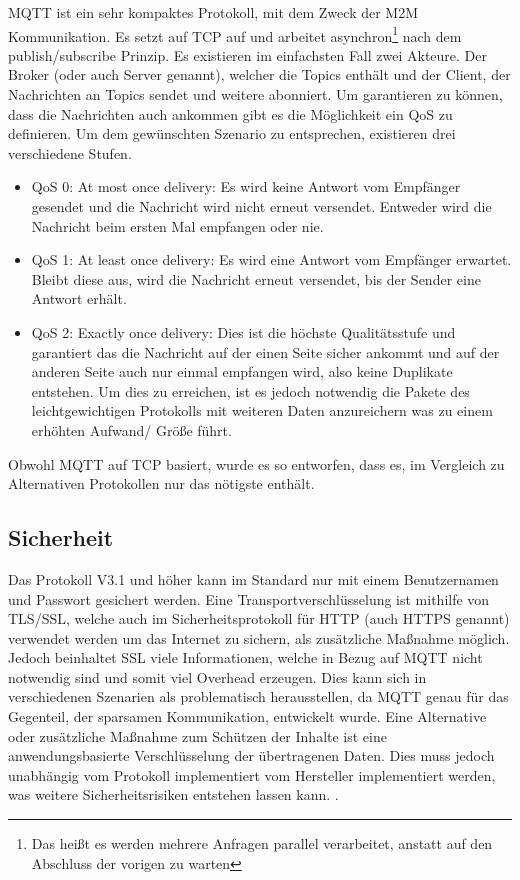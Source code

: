         \ac{MQTT} ist ein sehr kompaktes Protokoll, mit dem Zweck der \ac{M2M} Kommunikation.
        Es setzt auf TCP auf und arbeitet asynchron\footnote{Das heißt es werden mehrere Anfragen parallel verarbeitet, anstatt auf den Abschluss der vorigen zu warten} nach dem publish/subscribe Prinzip. Es existieren im einfachsten Fall zwei Akteure. Der Broker (oder auch Server genannt), welcher die Topics enthält und der Client, der Nachrichten an Topics sendet und weitere abonniert.
        Um garantieren zu können, dass die Nachrichten auch ankommen gibt es die Möglichkeit ein \ac{QoS} zu definieren. Um dem gewünschten Szenario zu entsprechen, existieren drei verschiedene Stufen. 
        \cite{soni2017survey}
        \begin{itemize}
            \item \glqq QoS 0: At most once delivery\grqq{}: Es wird keine Antwort vom Empfänger gesendet und die Nachricht wird nicht erneut versendet. Entweder wird die Nachricht beim ersten Mal empfangen oder nie.
            \item \glqq QoS 1: At least once delivery\grqq{}: Es wird eine Antwort vom Empfänger erwartet. Bleibt diese aus, wird die Nachricht erneut versendet, bis der Sender eine Antwort erhält.
            \item \glqq QoS 2: Exactly once delivery\grqq{}: Dies ist die höchste Qualitätsstufe und garantiert das die Nachricht auf der einen Seite sicher ankommt und auf der anderen Seite auch nur einmal empfangen wird, also keine Duplikate entstehen. Um dies zu erreichen, ist es jedoch notwendig die Pakete des leichtgewichtigen Protokolls mit weiteren Daten anzureichern was zu einem erhöhten Aufwand/ Größe führt.
        \end{itemize} \cite{gupta_banks_2015}
        Obwohl \ac{MQTT} auf \ac{TCP} basiert, wurde es so entworfen, dass es, im Vergleich zu Alternativen Protokollen nur das nötigste enthält. \cite{soni2017survey}

    \subsection{Sicherheit}
        Das Protokoll V3.1 und höher kann im Standard nur mit einem Benutzernamen und Passwort gesichert werden. Eine Transportverschlüsselung ist mithilfe von \ac{TLS}/\ac{SSL}, welche auch im Sicherheitsprotokoll für \ac{HTTP} (auch \ac{HTTPS} genannt) verwendet werden um das Internet zu sichern, als zusätzliche Maßnahme möglich. Jedoch beinhaltet SSL viele Informationen, welche in Bezug auf \ac{MQTT} nicht notwendig sind und somit viel Overhead erzeugen.
        Dies kann sich in verschiedenen Szenarien als problematisch herausstellen, da \ac{MQTT} genau für das Gegenteil, der sparsamen Kommunikation, entwickelt wurde.
        Eine Alternative oder zusätzliche Maßnahme zum Schützen der Inhalte ist eine anwendungsbasierte Verschlüsselung der übertragenen Daten. Dies muss jedoch unabhängig vom Protokoll implementiert vom Hersteller implementiert werden, was weitere Sicherheitsrisiken entstehen lassen kann. \cite{mqtt_org_2019}.


